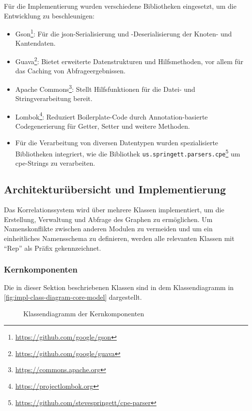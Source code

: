 Für die Implementierung wurden verschiedene Bibliotheken eingesetzt, um die Entwicklung zu beschleunigen:

\begin{itemize}
    \itemsep0em
    \item Gson\footnote{\url{https://github.com/google/gson}}: Für die \acrshort{json}-Serialisierung und -Deserialisierung der Knoten- und Kantendaten.
    \item Guava\footnote{\url{https://github.com/google/guava}}: Bietet erweiterte Datenstrukturen und Hilfsmethoden, vor allem für das Caching von Abfrageergebnissen.
    \item Apache Commons\footnote{\url{https://commons.apache.org}}: Stellt Hilfsfunktionen für die Datei- und Stringverarbeitung bereit.
    \item Lombok\footnote{\url{https://projectlombok.org}}: Reduziert Boilerplate-Code durch Annotation-basierte Codegenerierung für Getter, Setter und weitere Methoden.
    \item Für die Verarbeitung von diversen Datentypen wurden spezialisierte Bibliotheken integriert, wie die Bibliothek \texttt{us.springett.parsers.cpe}\footnote{\url{https://github.com/stevespringett/cpe-parser}} um \acrshort{cpe}-Strings zu verarbeiten.
\end{itemize}

\subsection{Architekturübersicht und Implementierung}\label{subsec:impl-arch-overview}

Das Korrelationssystem wird über mehrere Klassen implementiert, um die Erstellung, Verwaltung und Abfrage des Graphen zu ermöglichen.
Um Namenskonflikte zwischen anderen Modulen zu vermeiden und um ein einheitliches Namensschema zu definieren, werden alle relevanten Klassen mit \enquote{Rep} als Präfix gekennzeichnet.

\subsubsection{Kernkomponenten}

Die in dieser Sektion beschriebenen Klassen sind in dem Klassendiagramm in \autoref{fig:impl-class-diagram-core-model} dargestellt.

\begin{figure}[htbp]
    \centering
    \makebox[\textwidth]{}
    \caption{Klassendiagramm der Kernkomponenten}
    \label{fig:impl-class-diagram-core-model}
\end{figure}

